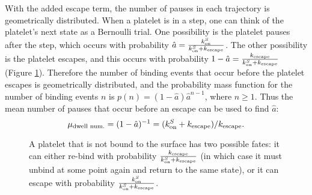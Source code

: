 \documentclass{biophys-new}
\newcommand{\tn}{\textnormal}
\newcommand{\inv}{^{-1}}
\begin{document}
With the added escape term, the number of pauses in each trajectory is
geometrically distributed. When a platelet is in a step, one can think
of the platelet's next state as a Bernoulli trial. One possibility is
the platelet pauses after the step, which occurs with probability
$\hat{a} = \frac{k^S_\textnormal{on}}{k^S_\textnormal{on} + k_\textnormal{escape}}$. The other
possibility is the platelet escapes, and this occurs with probability
$1 - \hat{a} = \frac{k_\textnormal{escape}}{k^S_\textnormal{on} + k_\textnormal{escape}}$ (Figure
\ref{fig:unbd-plt-fates}). Therefore the number of binding events that
occur before the platelet escapes is geometrically distributed, and
the probability mass function for the number of binding events $n$ is
$p(n) = (1 - \hat{a}) \hat{a}^{n - 1}$, where $n \ge 1$. Thus the mean
number of pauses that occur before an escape can be used to find
$\hat{a}$:
\begin{equation}
  \label{eq:avg-dwell-num}
  \mu_\tn{dwell num.}  = (1 - \hat{a})\inv = (\jvOnSlow + \jvEscape) /
  \jvEscape.
\end{equation}

\begin{figure}
  \centering
  \caption{A platelet that is not bound to the surface has two
    possible fates: it can either re-bind with probability
    $\frac{k_\textnormal{escape}}{k^S_\textnormal{on} + k_\textnormal{escape}}$ (in which case it must
    unbind at some point again and return to the same state), or it
    can escape with probability
    $\frac{k^S_\textnormal{on}}{k^S_\textnormal{on} + k_\textnormal{escape}}$.}
  \label{fig:unbd-plt-fates}
\end{figure}
\end{document}
